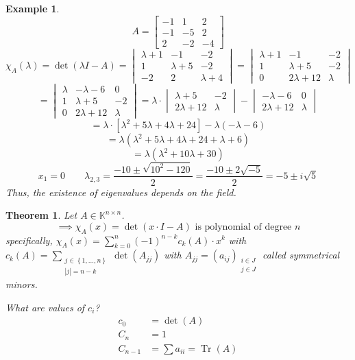 \documentclass{article}
\newtheorem{theorem}{Theorem}  \numberwithin{theorem}{section}
\newtheorem{example}{Example}  \numberwithin{example}{section}
\newcommand{\set}[1]{\left\{#1\right\}}
\begin{document}
\begin{example} %
  \[
    A = \begin{bmatrix}
      -1 & 1 & 2 \\
      -1 & -5 & 2 \\
      2 & -2 & -4
    \end{bmatrix}
  \]
  \[
    \chi_A(\lambda) = \det(\lambda I - A)
    = \begin{vmatrix}
      \lambda + 1 & -1 & -2 \\
      1 & \lambda + 5 & -2 \\
      -2 & 2 & \lambda+4
    \end{vmatrix}
    = \begin{vmatrix}
      \lambda+1 & -1 & -2 \\
      1 & \lambda+5 & -2 \\
      0 & 2\lambda+12 & \lambda
    \end{vmatrix}
  \] \[
    = \begin{vmatrix}
      \lambda & -\lambda-6 & 0 \\
      1 & \lambda+5 & -2 \\
      0 & 2\lambda+12 & \lambda
    \end{vmatrix} = \lambda \cdot \begin{vmatrix}
      \lambda+5 & -2 \\
      2\lambda+12 & \lambda
    \end{vmatrix}
    - \begin{vmatrix}
      -\lambda - 6 & 0 \\
      2\lambda+12 & \lambda
    \end{vmatrix}
  \] \[
    = \lambda \cdot [\lambda^2 + 5\lambda + 4\lambda + 24] - \lambda(-\lambda-6)
  \] \[
    = \lambda(\lambda^2 + 5\lambda + 4\lambda + 24 + \lambda + 6)
  \] \[
    = \lambda(\lambda^2 + 10\lambda + 30)
  \] \[
    x_1 = 0 \qquad \lambda_{2,3} = \frac{-10 \pm \sqrt{10^2 - 120}}{2} = \frac{-10 \pm 2\sqrt{-5}}{2} = -5 \pm i\sqrt{5}
  \]
  Thus, the existence of eigenvalues depends on the field.
\end{example}

\begin{theorem} %
  Let $A \in \mathbb K^{n \times n}$.
  \[ \implies \chi_A(x) = \det(x \cdot I - A) \text{ is polynomial of degree } n \]
  specifically, $\chi_A(x) = \sum_{k=0}^n (-1)^{n-k} c_k(A) \cdot x^k$ with $c_k(A) = \sum_{\substack{j \in \set{1, \dots, n} \\ |j| = n - k}} \det(A_{jj})$
  with $A_{jj} = (a_{ij})_{\substack{i \in J \\ j \in J}}$ called \emph{symmetrical minors}.

  What are values of $c_i$?
  \begin{align*}
    c_0 &= \det(A) \\
    C_n &= 1 \\
    C_{n-1} &= \sum a_{ii} = \operatorname{Tr}(A)
  \end{align*}
\end{theorem}
\end{document}
